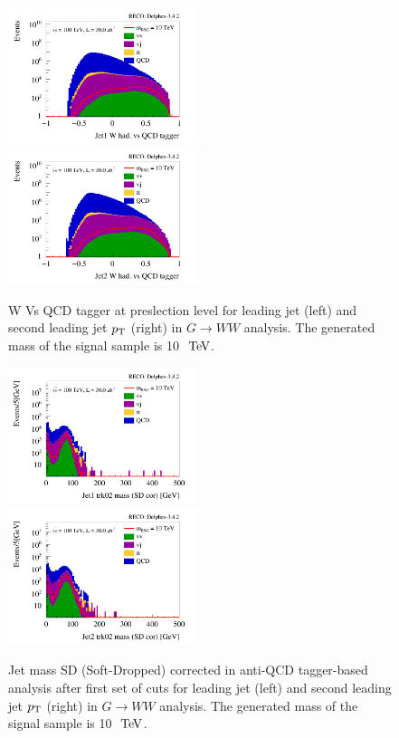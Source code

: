 \documentclass{cernrep}
\begin{document}
\begin{figure}[!htb]\centering
\includegraphics[width=0.495\textwidth]{Fig/RSGww/tagger/Jet1_Whad_vs_QCD_tagger_sel0_nostack_log.png}
\includegraphics[width=0.495\textwidth]{Fig/RSGww/tagger/Jet2_Whad_vs_QCD_tagger_sel0_nostack_log.png}
\caption{W Vs QCD tagger at preslection level for leading jet (left) and second leading jet $p\sb{\scriptstyle\mathrm{T}}$ (right) in $G \rightarrow WW$ analysis. The generated mass of the signal sample is 10 $\TeV$.}
\label{fig:RSGww_sel0_tagger}
\end{figure}

\begin{figure}[!htb]\centering
\includegraphics[width=0.495\textwidth]{Fig/RSGww/tagger/Jet1_trk02_SD_Cor_m_sel1_nostack_log.png}
\includegraphics[width=0.495\textwidth]{Fig/RSGww/tagger/Jet2_trk02_SD_Cor_m_sel1_nostack_log.png}
\caption{Jet mass SD (Soft-Dropped) corrected in anti-QCD tagger-based analysis after first set of cuts for leading jet (left) and second leading jet $p\sb{\scriptstyle\mathrm{T}}$ (right) in $G \rightarrow WW$ analysis. The generated mass of the signal sample is 10 $\TeV$.}
\label{fig:RSGww_sel1_tagger}
\end{figure}
\end{document}
